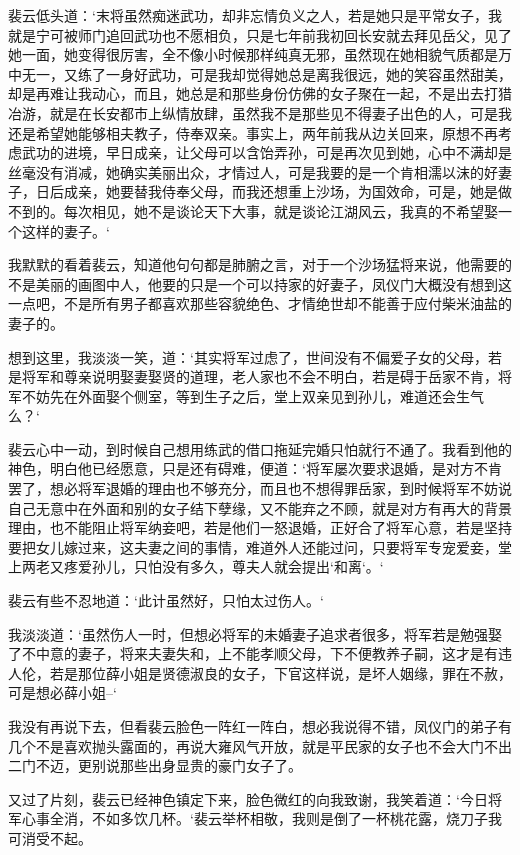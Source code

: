 裴云低头道：‘末将虽然痴迷武功，却非忘情负义之人，若是她只是平常女子，我就是宁可被师门追回武功也不愿相负，只是七年前我初回长安就去拜见岳父，见了她一面，她变得很厉害，全不像小时候那样纯真无邪，虽然现在她相貌气质都是万中无一，又练了一身好武功，可是我却觉得她总是离我很远，她的笑容虽然甜美，却是再难让我动心，而且，她总是和那些身份仿佛的女子聚在一起，不是出去打猎冶游，就是在长安都市上纵情放肆，虽然我不是那些见不得妻子出色的人，可是我还是希望她能够相夫教子，侍奉双亲。事实上，两年前我从边关回来，原想不再考虑武功的进境，早日成亲，让父母可以含饴弄孙，可是再次见到她，心中不满却是丝毫没有消减，她确实美丽出众，才情过人，可是我要的是一个肯相濡以沫的好妻子，日后成亲，她要替我侍奉父母，而我还想重上沙场，为国效命，可是，她是做不到的。每次相见，她不是谈论天下大事，就是谈论江湖风云，我真的不希望娶一个这样的妻子。‘

我默默的看着裴云，知道他句句都是肺腑之言，对于一个沙场猛将来说，他需要的不是美丽的画图中人，他要的只是一个可以持家的好妻子，凤仪门大概没有想到这一点吧，不是所有男子都喜欢那些容貌绝色、才情绝世却不能善于应付柴米油盐的妻子的。

想到这里，我淡淡一笑，道：‘其实将军过虑了，世间没有不偏爱子女的父母，若是将军和尊亲说明娶妻娶贤的道理，老人家也不会不明白，若是碍于岳家不肯，将军不妨先在外面娶个侧室，等到生子之后，堂上双亲见到孙儿，难道还会生气么？‘

裴云心中一动，到时候自己想用练武的借口拖延完婚只怕就行不通了。我看到他的神色，明白他已经愿意，只是还有碍难，便道：‘将军屡次要求退婚，是对方不肯罢了，想必将军退婚的理由也不够充分，而且也不想得罪岳家，到时候将军不妨说自己无意中在外面和别的女子结下孽缘，又不能弃之不顾，就是对方有再大的背景理由，也不能阻止将军纳妾吧，若是他们一怒退婚，正好合了将军心意，若是坚持要把女儿嫁过来，这夫妻之间的事情，难道外人还能过问，只要将军专宠爱妾，堂上两老又疼爱孙儿，只怕没有多久，尊夫人就会提出‘和离‘。‘

裴云有些不忍地道：‘此计虽然好，只怕太过伤人。‘

我淡淡道：‘虽然伤人一时，但想必将军的未婚妻子追求者很多，将军若是勉强娶了不中意的妻子，将来夫妻失和，上不能孝顺父母，下不便教养子嗣，这才是有违人伦，若是那位薛小姐是贤德淑良的女子，下官这样说，是坏人姻缘，罪在不赦，可是想必薛小姐--‘

我没有再说下去，但看裴云脸色一阵红一阵白，想必我说得不错，凤仪门的弟子有几个不是喜欢抛头露面的，再说大雍风气开放，就是平民家的女子也不会大门不出二门不迈，更别说那些出身显贵的豪门女子了。

又过了片刻，裴云已经神色镇定下来，脸色微红的向我致谢，我笑着道：‘今日将军心事全消，不如多饮几杯。‘裴云举杯相敬，我则是倒了一杯桃花露，烧刀子我可消受不起。

